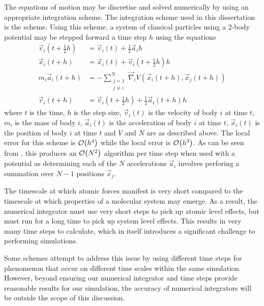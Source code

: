 %
The equations of motion may be discretise and solved numerically
by using an appropriate integration scheme.
%
The integration scheme used in this dissertation is
the \velocityverlet{} scheme.
%
Using this scheme, a system of classical particles using a 2-body potential
may be stepped forward a time step $h$ using the equations
%
\begin{subequations}
\label{eqn:velocity_verlet_scheme}
\begin{align}
    \vec{v}_i(t + \tfrac{1}{2} h) &=
        \vec{v}_i(t) + \tfrac{1}{2}\vec{a}_i h
    \\
    \vec{x}_i(t + h) &=
        \vec{x}_i(t) + \vec{v}_i(t + \tfrac{1}{2} h) h
    \\
    m_i \vec{a}_i(t + h) &=
        - \sum_{\substack{j=1\\j\ne{}i}}^N
            \vec{\nabla}_i V(\vec{x}_i(t+h), \vec{x}_j(t+h))
    \label{eqn:velocity_verlet_force_eval}
    \\
    \vec{v}_i(t+h) &=
        \vec{v}_i(t + \tfrac{1}{2} h) + \tfrac{1}{2} \vec{a}_i(t + h) h
\end{align}
\end{subequations}
where $t$ is the time,
$h$ is the step size,
$\vec{v}_i(t)$ is the velocity of body $i$ at time $t$,
$m_i$ is the mass of body $i$,
$\vec{a}_i(t)$ is the acceleration of body $i$ at time $t$,
$\vec{x}_i(t)$ is the position of body $i$ at time $t$ and
$V$ and $N$ are as described above.
%
The local error for this scheme is $\mathcal{O}{\left({ h^4 }\right)}$ while the local error
is $\mathcal{O}{\left({ h^3 }\right)}$.
%
As can be seen from
,
this produces an $\mathcal{O}{\left({ N^2 }\right)}$ algorithm per time step
when used with a \twobody{} potential as
determining each of the $N$ accelerations $\vec{a}_i$ involves
perforing a summation over $N-1$ positions $\vec{x}_j$.

%
The timescale at which atomic forces manifest is very short compared to
the timescale at which properties of a molecular system may emerge.
%
As a result, the numerical integrator must use very short steps to
pick up atomic level effects, but must run for a long
time to pick up system level effects.
%
This results in very many time steps to calculate, which
in itself introduces a significant challenge to performing simulations.

Some schemes attempt to address this issue by
using different time steps for phenomenon that occur on
different time scales within the same simulation.
%
However, beyond ensuring our numerical integrator and time steps provide
reasonable results for our simulation,
the accuracy of numerical integrators will be
outside the scope of this discussion.


